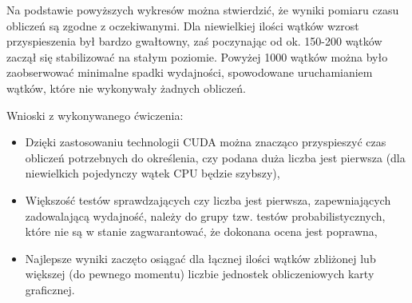 \documentclass[a4paper,12pt]{article}
\newenvironment{lista}{
\begin{itemize}
  \setlength{\itemsep}{1pt}
  \setlength{\parskip}{0pt}
  \setlength{\parsep}{0pt}
}{\end{itemize}}
\begin{document}
Na podstawie powyższych wykresów można stwierdzić, że wyniki pomiaru czasu obliczeń są zgodne z oczekiwanymi. Dla niewielkiej ilości wątków wzrost przyspieszenia był bardzo gwałtowny, zaś poczynając od ok. 150-200 wątków zaczął się stabilizować na stałym poziomie. Powyżej 1000 wątków można było zaobserwować minimalne spadki wydajności, spowodowane uruchamianiem wątków, które nie wykonywały żadnych obliczeń.

Wnioski z wykonywanego ćwiczenia:
\begin{lista}
\item Dzięki zastosowaniu technologii CUDA można znacząco przyspieszyć czas obliczeń potrzebnych do określenia, czy podana duża liczba jest pierwsza (dla niewielkich pojedynczy wątek CPU będzie szybszy),
\item Większość testów sprawdzających czy liczba jest pierwsza, zapewniających zadowalającą wydajność, należy do grupy tzw. testów probabilistycznych, które nie są w stanie zagwarantować, że dokonana ocena jest poprawna, 
\item Najlepsze wyniki zaczęto osiągać dla łącznej ilości wątków zbliżonej lub większej (do pewnego momentu) liczbie jednostek obliczeniowych karty graficznej.
\end{lista}
\end{document}
